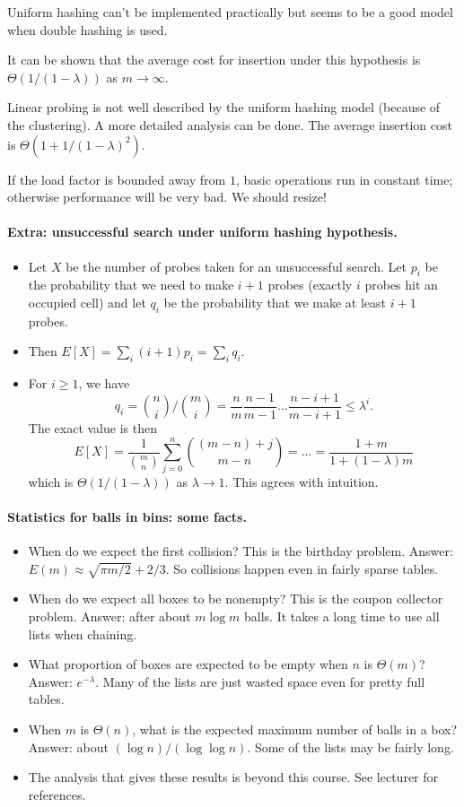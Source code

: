Uniform hashing can't be implemented practically but seems to be a good 
model when double hashing is used.

It can be shown that the average cost for insertion under this 
hypothesis is $\Theta(1/(1-\lambda))$ as $m \to \infty$. 

Linear probing is not well described by the uniform hashing model 
(because of the clustering). A more detailed analysis can be done. 
The average insertion cost is $\Theta(1 + 1/(1 - \lambda)^2)$.

If the load factor is bounded away from $1$, basic operations 
run in constant time; otherwise performance will be very bad. We should resize!


\paragraph{Extra: unsuccessful search under uniform hashing hypothesis.}
\begin{itemize}
\item Let $X$ be the number of probes taken for an unsuccessful search. 
Let $p_i$ be the probability that we need to make $i+1$ probes 
(exactly $i$ probes hit an occupied cell) and let $q_i$ be the probability 
that we make at least $i+1$ probes. 
\item Then 
$E[X] = \sum_i (i+1) p_i = \sum_i q_i$.
\item For $i \geq 1$, we have
$$ q_i = \binom{n}{i}/\binom{m}{i} = \frac{n}{m} \frac{n-1}{m-1} 
\dots \frac{n - i + 1}{m - i + 1}  \leq \lambda^i.
$$
The exact value is then
$$
E[X] = \frac{1}{\binom{m}{n}} \sum_{j=0}^n \binom{(m-n)+j}{m-n} = 
\dots = \frac{1+m}{1+(1-\lambda)m}
$$
which is $\Theta(1/(1 - \lambda))$ as $\lambda \to 1$. This agrees with 
intuition.
\end{itemize}

\paragraph{Statistics for balls in bins: some facts.}
\begin{itemize}
\item When do we expect the first collision? This is the 
{birthday problem}. Answer: $E(m) \approx \sqrt{\pi m/2} + 2/3$.
So collisions happen even in fairly sparse tables.
\item When do we expect all boxes to be nonempty? This is the 
{coupon collector problem}. Answer: after about $m \log m$ balls. 
It takes a long time to use all lists when chaining.
\item What proportion of boxes are expected to be empty when $n$ is $\Theta(m)$? 
Answer: $e^{-\lambda}$. Many of the lists are just wasted space even for 
pretty full tables.
\item When $m$ is $\Theta(n)$, what is the expected maximum number of balls in a box? 
Answer: about $(\log n)/(\log \log n)$. Some of the lists may be fairly long. 
\item The analysis that gives these results is beyond this course. See lecturer for 
references.
\end{itemize}

